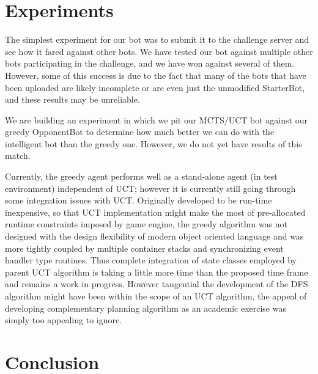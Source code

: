 \documentclass[a4paper,11pt]{article}
\begin{document}
\section{Experiments}\label{sec:experiments}
The simplest experiment for our bot was to submit it to the challenge server and see how it 
fared against other bots.  We have tested our bot against multiple other bots participating 
in the challenge, and we have won against several of them.  However, some of this success is 
due to the fact that many of the bots that have been uploaded are likely incomplete or are 
even just the unmodified StarterBot, and these results may be unreliable.

We are building an experiment in which we pit our MCTS/UCT bot against our greedy 
OpponentBot to determine how much better we can do with the intelligent bot than the greedy 
one.  However, we do not yet have results of this match.

Currently, the greedy agent performs well as a stand-alone agent (in test environment) 
independent of UCT; however it is currently still going through some integration issues with 
UCT. Originally developed to be run-time inexpensive, so that UCT implementation might make 
the most of pre-allocated runtime constraints imposed by game engine, the greedy algorithm 
was not designed with the design flexibility of modern object oriented language and was more 
tightly coupled by multiple container stacks and synchronizing event handler type routines. 
Thus complete integration of state classes employed by parent UCT algorithm is taking a 
little more time than the proposed time frame and remains a work in progress. However 
tangential the development of the DFS algorithm might have been within the scope of an UCT 
algorithm, the appeal of developing complementary planning algorithm as an academic exercise 
was simply too appealing to ignore.

\section{Conclusion}\label{sec:conclusion}



\end{document}
